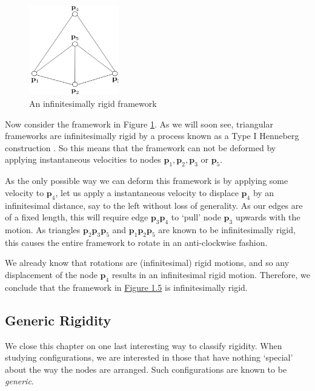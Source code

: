 \begin{example}
\begin{figure}[htbp]
    \centering
    \includegraphics[width = 0.35\textwidth]{Chapter 2/11. inf_rigid.png}
    \caption{An infinitesimally rigid framework}
    \label{eg: inf rigid}
\end{figure}
\vspace{-2mm}
\begin{flushleft}
Now consider the framework in Figure \ref{eg: inf rigid}. As we will soon see, triangular frameworks are infinitesimally rigid by a process known as a Type I Henneberg construction \cite{henneberg}. So this means that the framework can not be deformed by applying instantaneous velocities to nodes $\textbf{p}_1,\textbf{p}_2,\textbf{p}_3$  or $\textbf{p}_5$.     
\end{flushleft}

\begin{flushleft}
As the only possible way we can deform this framework is by applying some velocity to $\textbf{p}_4$, let us apply a instantaneous velocity to displace $\textbf{p}_4$ by an infinitesimal distance, say to the left without loss of generality. As our edges are of a fixed length, this will require edge $\textbf{p}_3\textbf{p}_4$ to `pull' node $\textbf{p}_3$ upwards with the motion. As triangles $\textbf{p}_2\textbf{p}_3\textbf{p}_5$ and $\textbf{p}_1\textbf{p}_2\textbf{p}_5$ are known to be infinitesimally rigid, this causes the entire framework to rotate in an anti-clockwise fashion.
\end{flushleft}

\noindent
We already know that rotations are (infinitesimal) rigid motions, and so any displacement of the node $\textbf{p}_4$ results in an infinitesimal rigid motion. Therefore, we conclude that the framework in \hyperref[eg: inf rigid]{Figure 1.5} is infinitesimally rigid.
\end{example}

\subsection{Generic Rigidity}
We close this chapter on one last interesting way to classify rigidity. When studying configurations, we are interested in those that have nothing `special' about the way the nodes are arranged. Such configurations are known to be \textit{generic}.

